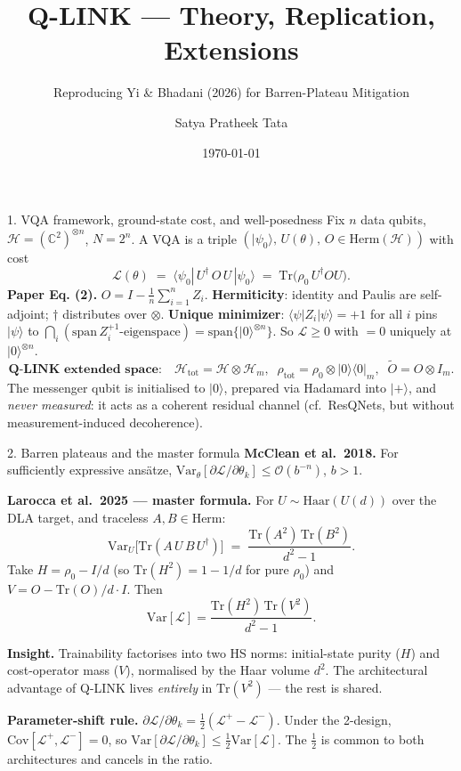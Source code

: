\documentclass[10pt, aspectratio=169]{beamer}
\title[Q-LINK]{Q-LINK — Theory, Replication, Extensions}
\subtitle{Reproducing Yi \& Bhadani (2026) for Barren-Plateau Mitigation}
\author{Satya Pratheek Tata}
\institute{One-month structured exercise (manager: Desu Surya Sai Teja)}
\date{\today}
\newcommand{\insight}[1]{\textbf{\textcolor{ours}{Insight.}} #1}
\begin{document}
\begin{frame}\titlepage\end{frame}

\begin{frame}{1. VQA framework, ground-state cost, and well-posedness}
    \scriptsize
    Fix $n$ data qubits, $\mathcal{H} = (\mathbb{C}^2)^{\otimes n}$, $N = 2^n$. A VQA is a triple $(|\psi_0\rangle,\, U(\theta),\, O \in \mathrm{Herm}(\mathcal{H}))$ with cost
    \[
        \mathcal{L}(\theta) \;=\; \langle \psi_0 |\, U^\dagger\, O\, U\, |\psi_0\rangle \;=\; \mathrm{Tr}\bigl(\rho_0\, U^\dagger O U\bigr).
    \]
    \textbf{Paper Eq. (2).} \quad $O = I - \tfrac{1}{n}\sum_{i=1}^n Z_i$. \quad
    \textbf{Hermiticity}: identity and Paulis are self-adjoint; $\dagger$ distributes over $\otimes$. \quad
    \textbf{Unique minimizer}: $\langle\psi|Z_i|\psi\rangle = +1$ for all $i$ pins $|\psi\rangle$ to $\bigcap_i (\mathrm{span}\,Z_i^{+1}\text{-eigenspace}) = \mathrm{span}\{|0\rangle^{\otimes n}\}$. So $\mathcal{L} \ge 0$ with $=0$ uniquely at $|0\rangle^{\otimes n}$.
    \[
        \textbf{Q-LINK extended space:}\quad \mathcal{H}_{\mathrm{tot}} = \mathcal{H} \otimes \mathcal{H}_m, \;\; \rho_{\mathrm{tot}} = \rho_0 \otimes |0\rangle\langle 0|_m, \;\; \tilde O = O \otimes I_m.
    \]
    The messenger qubit is initialised to $|0\rangle$, prepared via Hadamard into $|+\rangle$, and \emph{never measured}: it acts as a coherent residual channel (cf.\ ResQNets, but without measurement-induced decoherence).
\end{frame}

\begin{frame}{2. Barren plateaus and the master formula}
    \scriptsize
    \textbf{McClean et al.\ 2018.} For sufficiently expressive ansätze,
    $\mathrm{Var}_\theta[\partial \mathcal{L}/\partial \theta_k] \le \mathcal{O}(b^{-n})$, $b > 1$.

    \textbf{Larocca et al.\ 2025 — master formula.} For $U \sim \mathrm{Haar}(U(d))$ over the DLA target, and traceless $A, B \in \mathrm{Herm}$:
    \[
        \mathrm{Var}_U\bigl[\mathrm{Tr}(A\, U\, B\, U^\dagger)\bigr] \;=\; \frac{\mathrm{Tr}(A^2)\,\mathrm{Tr}(B^2)}{d^2 - 1}.
    \]
    Take $H = \rho_0 - I/d$ (so $\mathrm{Tr}(H^2) = 1 - 1/d$ for pure $\rho_0$) and $V = O - \mathrm{Tr}(O)/d \cdot I$.
    Then
    \[
        \mathrm{Var}[\mathcal{L}] = \frac{\mathrm{Tr}(H^2)\,\mathrm{Tr}(V^2)}{d^2 - 1}.
    \]

    \insight{Trainability factorises into two HS norms: initial-state purity ($H$) and cost-operator
    mass ($V$), normalised by the Haar volume $d^2$. The architectural advantage of Q-LINK lives
    \emph{entirely} in $\mathrm{Tr}(V^2)$ — the rest is shared.}

    \textbf{Parameter-shift rule.} \;$\partial \mathcal{L}/\partial \theta_k = \tfrac{1}{2}(\mathcal{L}^+ - \mathcal{L}^-)$.
    Under the 2-design, $\mathrm{Cov}[\mathcal{L}^+, \mathcal{L}^-] = 0$, so
    $\mathrm{Var}[\partial \mathcal{L}/\partial \theta_k] \le \tfrac{1}{2}\mathrm{Var}[\mathcal{L}]$. The $\tfrac{1}{2}$ is common to both architectures and cancels in the ratio.
\end{frame}
\end{document}
